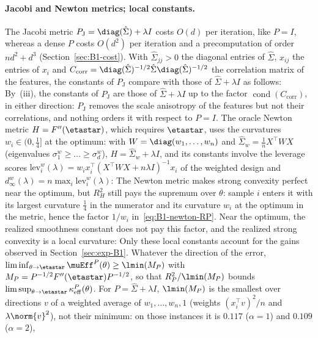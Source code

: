 \paragraph{Jacobi and Newton metrics; local constants.}
The Jacobi metric $P_{\mathrm J}=\diag(\hat\Sigma)+\lambda I$ costs $O(d)$ per iteration, like $P=I$, whereas a dense
$P$ costs $O(d^2)$ per iteration and a precomputation of order $nd^2+d^3$ (Section~\ref{sec:B1-cost}). With
$\hat\Sigma_{jj}>0$ the diagonal entries of $\hat\Sigma$, $x_{ij}$ the entries of $x_i$ and
$C_{\mathrm{corr}}=\diag(\hat\Sigma)^{-1/2}\hat\Sigma\diag(\hat\Sigma)^{-1/2}$ the correlation matrix of the features,
the constants of $P_{\mathrm J}$ compare with those of $\hat\Sigma+\lambda I$ as follows:
By~(iii), the constants of $P_{\mathrm J}$ are those of $\hat\Sigma+\lambda I$ up to the factor
$\operatorname{cond}(C_{\mathrm{corr}})$, in either direction: $P_{\mathrm J}$ removes the scale anisotropy of the
features but not their correlations, and nothing orders it with respect to $P=I$. The oracle Newton metric
$H=F''(\etastar)$, which requires $\etastar$, uses the curvatures $w_i\in(0,\frac14]$ at the optimum: with
$W=\diag(w_1,\dots,w_n)$ and $\hat\Sigma_w=\frac1nX^\top WX$ (eigenvalues $\sigma^w_1\ge\dots\ge\sigma^w_d$),
$H=\hat\Sigma_w+\lambda I$, and its constants involve the leverage scores
$\mathrm{lev}^w_i(\lambda)=w_ix_i^\top(X^\top WX+n\lambda I)^{-1}x_i$ of the weighted design and
$d^w_\infty(\lambda)=n\max_i\mathrm{lev}^w_i(\lambda)$:
The Newton metric makes strong convexity perfect near the optimum, but $R_H^2$ still pays the supremum over $\theta$:
sample $i$ enters it with its largest curvature $\frac14$ in the numerator and its curvature $w_i$ at the optimum in the
metric, hence the factor $1/w_i$ in~\eqref{eq:B1-newton-RP}. Near the optimum, the realized smoothness constant does
not pay this factor, and the realized strong convexity is a local curvature:
Only these local constants account for the gains observed in Section~\ref{sec:exp-B1}. Whatever the direction of the
error, $\liminf_{\theta\to\etastar}\muEff^P(\theta)\ge\lmin(M_P)$ with $M_P=P^{-1/2}F''(\etastar)P^{-1/2}$, so that
$R_P^2/\lmin(M_P)$ bounds $\limsup_{\theta\to\etastar}\kappa^P_{\mathrm{eff}}(\theta)$. For $P=\hat\Sigma+\lambda I$,
$\lmin(M_P)$ is the smallest over directions $v$ of a weighted average of $w_1,\dots,w_n,1$ (weights $(x_i^\top v)^2/n$
and $\lambda\norm{v}^2$), not their minimum: on those instances it is $0.117$ ($\alpha=1$) and $0.109$ ($\alpha=2$),
